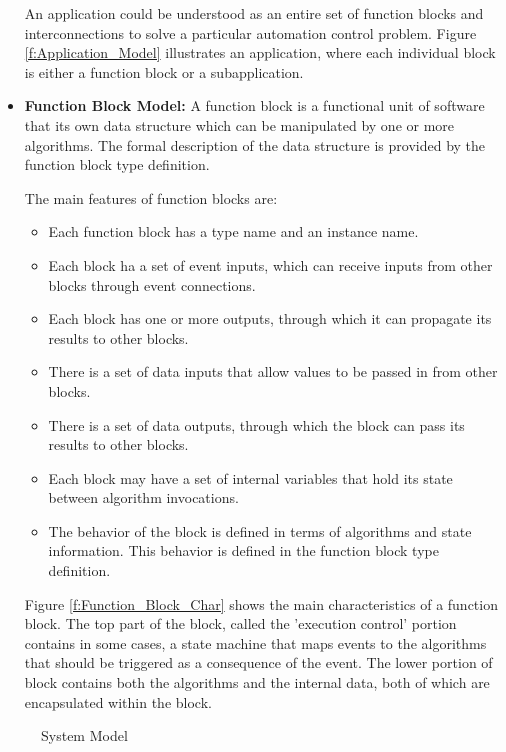 \begin{itemize}
An application could be understood as an entire set of function
blocks and interconnections to solve a particular automation
control problem. Figure \ref{f:Application_Model} illustrates an
application, where each individual block is either a function
block or a subapplication.

\item {\bf Function Block Model:} A function block is a functional
unit of software that its own data structure which can be
manipulated by one or more algorithms. The formal description of
the data structure is provided by the function block type
definition.

The main features of function blocks are:
\begin{itemize}
\item Each function block has a type name and an instance name.
\item Each block ha a set of event inputs, which can receive
inputs from other blocks through event connections.
\item Each block has one or more outputs, through which it can
propagate its results to other blocks.
\item There is a set of data inputs that allow values to be passed
in from other blocks.
\item There is a set of data outputs, through which the block can
pass its results to other blocks.
\item Each block may have a set of internal variables that hold
its state between algorithm invocations.
\item The behavior of the block is defined in terms of algorithms
and state information. This behavior is defined in the function
block type definition.
\end{itemize}

Figure \ref{f:Function_Block_Char} shows the main characteristics
of a function block. The top part of the block, called the
'execution control' portion contains in some cases, a state
machine that maps events to the algorithms that should be
triggered as a consequence of the event. The lower portion of
block contains both the algorithms and the internal data, both of
which are encapsulated within the block.

\end{itemize}

%
\begin{figure}
\begin{center}
 \caption[System
Model]{System Model {\protect ~\cite{IEC-61499}}}
\label{f:System_Model}
\end{center}
\end{figure}
%

